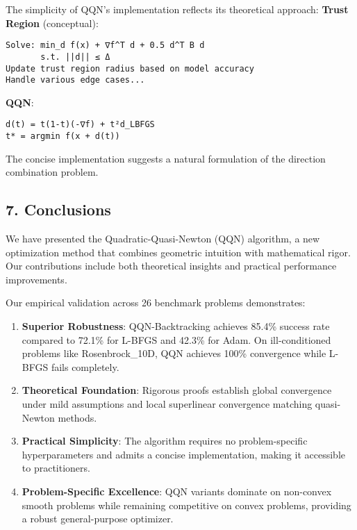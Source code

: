 The simplicity of QQN's implementation reflects its theoretical approach:
\textbf{Trust Region} (conceptual):

\begin{verbatim}
Solve: min_d f(x) + ∇f^T d + 0.5 d^T B d
       s.t. ||d|| ≤ Δ
Update trust region radius based on model accuracy
Handle various edge cases...
\end{verbatim}

\textbf{QQN}:

\begin{verbatim}
d(t) = t(1-t)(-∇f) + t²d_LBFGS
t* = argmin f(x + d(t))
\end{verbatim}

The concise implementation suggests a natural formulation of the direction combination problem.

\hypertarget{conclusions}{%
\subsection{7. Conclusions}\label{conclusions}}

We have presented the Quadratic-Quasi-Newton (QQN) algorithm, a new optimization method that combines geometric
intuition with mathematical rigor. Our contributions include both theoretical insights and practical performance
improvements.

Our empirical validation across 26 benchmark problems demonstrates:

\begin{enumerate}
\def\labelenumi{\arabic{enumi}.}
\item
  \textbf{Superior Robustness}: QQN-Backtracking achieves 85.4\% success rate compared to 72.1\% for L-BFGS and 42.3\%
  for Adam. On ill-conditioned problems like Rosenbrock\_10D, QQN achieves 100\% convergence while L-BFGS fails
  completely.
\item
  \textbf{Theoretical Foundation}: Rigorous proofs establish global convergence under mild assumptions and local
  superlinear convergence matching quasi-Newton methods.
\item
  \textbf{Practical Simplicity}: The algorithm requires no problem-specific hyperparameters and admits a concise
  implementation, making it accessible to practitioners.
\item
  \textbf{Problem-Specific Excellence}: QQN variants dominate on non-convex smooth problems while remaining competitive
  on convex problems, providing a robust general-purpose optimizer.
\end{enumerate}

